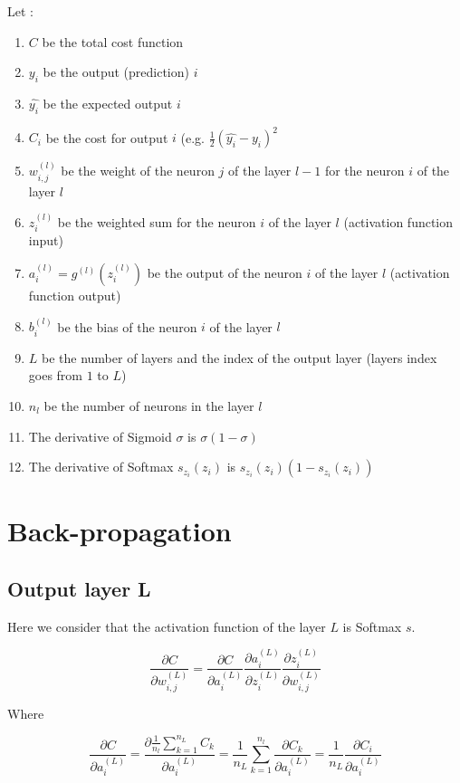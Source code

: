 \documentclass[11pt,a4paper]{report}
\begin{document}
Let :
\begin{enumerate}
    \item $C$ be the total cost function
    \item $y_i$ be the output (prediction) $i$
    \item $\hat{y_i}$ be the expected output $i$
    \item $C_i$ be the cost for output $i$ (e.g. $\frac{1}{2}\left(\hat{y_i}-y_i\right)^2$
    \item $w_{i,j}^{(l)}$ be the weight of the neuron $j$ of the layer $l-1$ for the neuron $i$ of the layer $l$
    \item $z_i^{(l)}$ be the weighted sum for the neuron $i$ of the layer $l$ (activation function input)
    \item $a_i^{(l)} = g^{(l)}(z_i^{(l)})$ be the output of the neuron $i$ of the layer $l$ (activation function output)
    \item $b_i^{(l)}$ be the bias of the neuron $i$ of the layer $l$
    \item $L$ be the number of layers and the index of the output layer (layers index goes from $1$ to $L$)
    \item $n_l$ be the number of neurons in the layer $l$
    \item The derivative of Sigmoid $\sigma$ is $\sigma (1-\sigma)$
    \item The derivative of Softmax $s_{z_i}(z_i)$ is $s_{z_i}(z_i)\left( 1 - s_{z_i}(z_i)\right)$
\end{enumerate}

\newpage
\section{Back-propagation}

\subsection{Output layer L}

Here we consider that the activation function of the layer $L$ is Softmax $s$.


\begin{equation*}
    \frac{\partial C}{\partial w_{i,j}^{(L)}} = \frac{\partial C}{\partial a_i^{(L)}} \frac{\partial a_i^{(L)}}{\partial z_i^{(L)}} \frac{\partial z_i^{(L)}}{\partial w_{i,j}^{(L)}}
\end{equation*}

Where

\begin{equation*}
    \frac{\partial C}{\partial a_i^{(L)}} = \frac{\partial \frac{1}{n_{l}} \sum\limits_{k=1}^{n_{L}} C_k}{\partial a_i^{(L)}} = \frac{1}{n_{L}} \sum\limits_{k=1}^{n_{l}} \frac{\partial C_k}{\partial a_i^{(L)}} = \frac{1}{n_{L}}\frac{\partial C_i}{\partial a_i^{(L)}}
\end{equation*}
\end{document}
